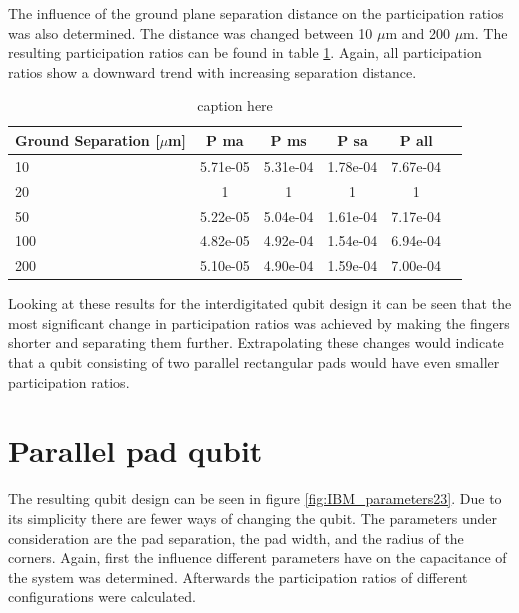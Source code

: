 The influence of the ground plane separation distance on the participation ratios was also determined. The distance was changed between 10 \(\mu\)m and 200 \(\mu\)m. The resulting participation ratios can be found in table \ref{table:ratio_groundseparation}. Again, all participation ratios show a downward trend with increasing separation distance. 

\begin{table}
	\begin{center}
		\begin{tabular}{ | l || c | c | c | c | c |}
			\hline
			Ground Separation [\(\mu\)m] & P ma & P ms & P sa & P all \\ \hline
			10 & 5.71e-05 & 5.31e-04 & 1.78e-04 & 7.67e-04 \\
			20 & 1 & 1 & 1 & 1 \\
			50 & 5.22e-05 & 5.04e-04 & 1.61e-04 & 7.17e-04 \\
			100 & 4.82e-05 & 4.92e-04 & 1.54e-04 & 6.94e-04 \\
			200 & 5.10e-05 & 4.90e-04 & 1.59e-04 & 7.00e-04\\
			\hline
		\end{tabular}
	\end{center}
	\caption{caption here}
	\label{table:ratio_groundseparation}
\end{table}

Looking at these results for the interdigitated qubit design it can be seen that the most significant change in participation ratios was achieved by making the fingers shorter and separating them further. Extrapolating these changes would indicate that a qubit consisting of two parallel rectangular pads would have even smaller participation ratios.


\section{Parallel pad qubit}
The resulting qubit design can be seen in figure \ref{fig:IBM_parameters23}. Due to its simplicity there are fewer ways of changing the qubit. The parameters under consideration are the pad separation, the pad width, and the radius of the corners. Again, first the influence different parameters have on the capacitance of the system was determined. Afterwards the participation ratios of different configurations were calculated.


